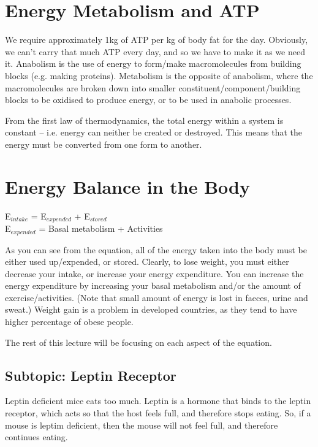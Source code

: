 \section{Energy Metabolism and ATP}

We require approximately 1kg of ATP per kg of body fat for the day.
Obviously, we can't carry that much ATP every day, and so we have to make it as we need it.
Anabolism is the use of energy to form/make macromolecules from building blocks (e.g. making proteins).
Metabolism is the opposite of anabolism, where the macromolecules are broken down into smaller constituent/component/building blocks to be oxidised to produce energy, or to be used in anabolic processes.

From the first law of thermodynamics, the total energy within a system is constant -- i.e. energy can neither be created or destroyed.
This means that the energy must be converted from one form to another.

\section{Energy Balance in the Body}

\begin{center}
E$_{intake}$ = E$_{expended}$ + E$_{stored}$\\
\vspace{0.5cm}
E$_{expended}$ = Basal metabolism + Activities
\end{center}

As you can see from the equation, all of the energy taken into the body must be either used up/expended, or stored.
Clearly, to lose weight, you must either decrease your intake, or increase your energy expenditure.
You can increase the energy expenditure by increasing your basal metabolism and/or the amount of exercise/activities.
(Note that small amount of energy is lost in faeces, urine and sweat.)
Weight gain is a problem in developed countries, as they tend to have higher percentage of obese people.

The rest of this lecture will be focusing on each aspect of the equation.

\subsection{Subtopic: Leptin Receptor}

Leptin deficient mice eats too much.
Leptin is a hormone that binds to the leptin receptor, which acts so that the host feels full, and therefore stops eating.
So, if a mouse is leptim deficient, then the mouse will not feel full, and therefore continues eating.

